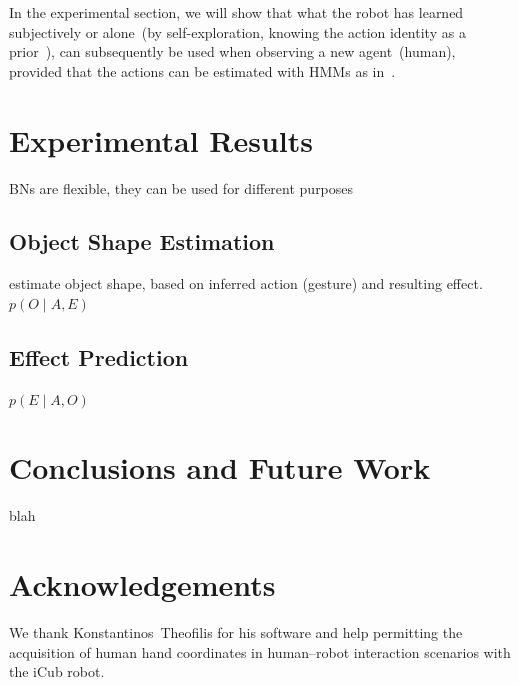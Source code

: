 \documentclass[a4paper]{article}
\newcommand{\hr}{human--robot}
\newcommand{\hri}{\hr{} interaction}
\begin{document}
In the experimental section, we will show that what the robot has learned subjectively or alone~(by self-exploration, knowing the action identity as a prior~\cite{salvi:2012:smcb}), can subsequently be used when observing a new agent~(human), provided that the actions can be estimated with \acp{HMM} as in~\cite{saponaro:2013:crhri}.

\section{Experimental Results}

\acp{BN} are flexible, they can be used for different purposes

\subsection{Object Shape Estimation}

estimate object shape, based on inferred action (gesture) and resulting effect. $p(O \mid A, E)$

\subsection{Effect Prediction}

$p(E \mid A, O)$


\section{Conclusions and Future Work}

blah

\section{Acknowledgements}
We thank Konstantinos~Theofilis for his software and help permitting the acquisition of human hand coordinates in \hri{} scenarios with the iCub robot.%

\nocite{*} %

%

\end{document}

